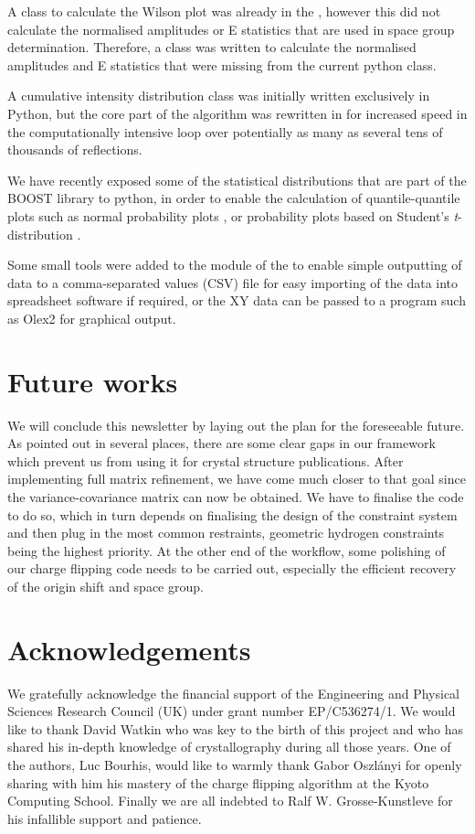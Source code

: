 \documentclass[12pt]{article}
\begin{document}
A class to calculate the Wilson plot was already in the \cctbx, however this did not calculate the normalised amplitudes or E statistics that are used in space group determination. Therefore, a \cpp class was written to calculate the normalised amplitudes and E statistics that were missing from the current python class.

A cumulative intensity distribution class \cite{Howells:1950} was initially written exclusively in Python, but the core part of the algorithm was rewritten in \cpp for increased speed in the computationally intensive loop over potentially as many as several tens of thousands of reflections.

We have recently exposed some of the statistical distributions that are part of the BOOST \cpp library \cite{boostcpp} to python, in order to enable the calculation of quantile-quantile plots such as normal probability plots \cite{Abrahams:1971}, or probability plots based on Student's \textit{t}-distribution \cite{Hooft:2009}.

Some small tools were added to the \iotbx module of the \cctbx to enable simple outputting of data to a comma-separated values (CSV) file for easy importing of the data into spreadsheet software if required, or the XY data can be passed to a program such as Olex2 \cite{Dolomanov:2009} for graphical output.


\section{Future works}

We will conclude this newsletter by laying out the plan for the foreseeable future. As pointed out in several places, there are some clear gaps in our framework which prevent us from using it for crystal structure publications. After implementing full matrix refinement, we have come much closer to that goal since the variance-covariance matrix can now be obtained. We have to finalise the code to do so, which in turn depends on finalising the design of the constraint system and then plug in the most common restraints, geometric hydrogen constraints being the highest priority. At the other end of the workflow, some polishing of our charge flipping code needs to be carried out, especially the efficient recovery of the origin shift and space group.


\section*{Acknowledgements}
We gratefully acknowledge the financial support of the Engineering and Physical Sciences Research Council (UK) under grant number EP/C536274/1. We would like to thank David Watkin who was key to the birth of this project and who has shared his in-depth knowledge of crystallography during all those years. One of the authors, Luc Bourhis, would like to warmly thank Gabor Oszl{\'a}nyi for openly sharing with him his mastery of the charge flipping algorithm at the Kyoto Computing School. Finally we are all indebted to Ralf W. Grosse-Kunstleve for his infallible support and patience.


\end{document}
